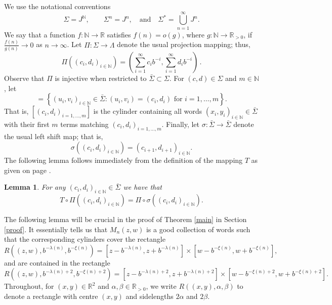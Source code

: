 \documentclass[12pt]{article}
\newtheorem{lemma}[definition]{Lemma}
\theoremstyle{remark}
\numberwithin{equation}{section}
\renewcommand{\Bbb}[1]{\mathbb{#1}}
\newcommand{\N}{{\Bbb N}}         %
\newcommand{\R}{{\Bbb R}}        %
\newcommand{\0}{\mathbf{0}}
\begin{document}
We use the notational conventions
\begin{equation*}
    \Sigma=J^{\N}, \qquad \Sigma^{n}=J^{n}, \quad \text{and} \quad \Sigma^{*}=\bigcup_{n=1}^{\infty}J^{n}.
\end{equation*}
We say that a function $f: \N \to \R$ satisfies $f(n) = o(g)$, where $g: \N \to \R_{>0}$, if $\frac{f(n)}{g(n)} \to 0$ as $n \to \infty$.
Let $\Pi:\Sigma \to \Lambda$ denote the usual projection mapping; thus,
\begin{equation*}
    \Pi((c_{i},d_{i})_{i \in \N}) = \left( \sum_{i=1}^{\infty}c_{i}b^{-i}, \sum_{i=1}^{\infty}d_{i}b^{-i} \right) \, .
\end{equation*}
Observe that $\Pi$ is injective when restricted to $\bar{\Sigma} \subset \Sigma$. For $(c,d) \in \Sigma$ and $m \in \N$, let
\begin{equation*}
    [(c_{i},d_{i})_{i=1, \dots , m}]=\left\{(u_{i},v_{i})_{i \in \N} \in \bar{\Sigma} : (u_{i},v_{i})=(c_{i},d_{i}) \text{ for } i=1, \dots , m \right\}.
\end{equation*}
 That is, $[(c_{i},d_{i})_{i =1, \dots , m}]$ is the cylinder containing all words $(x_{i},y_{i})_{i \in \N} \in \bar{\Sigma}$ with their first $m$ terms matching $(c_{i},d_{i})_{i =1, \dots , m}$. Finally, let $\sigma: \bar{\Sigma} \to \bar{\Sigma}$ denote the usual {left} shift map; that is,
\[\sigma\left( (c_{i},d_{i})_{i \in \N} \right)= (c_{i+1},d_{i+1})_{i \in \N}.\]
The following lemma follows immediately from the definition of the mapping $T$ {as given on page \pageref{T definition}}.

\begin{lemma}
For any $(c_{i},d_{i})_{i \in\N} \in\bar{\Sigma}$ we have that
\begin{equation*}
    T\circ \Pi\left((c_{i},d_{i})_{i \in \N}\right)=\Pi\circ \sigma \left( (c_{i},d_{i})_{i \in \N} \right).
\end{equation*}
\end{lemma}

The following lemma will be crucial
in the proof of Theorem \ref{main} in Section \ref{proof}. It essentially tells us that $M_{n}(z,w)$ is a good collection of words such that the corresponding cylinders cover the rectangle
\begin{equation*}
R\left((z,w), b^{-\lambda(n)}, b^{-\xi(n)}\right)=[z-b^{-\lambda(n)},z+b^{-\lambda(n)}]\times [w-b^{-\xi(n)}, w+b^{-\xi(n)}],
\end{equation*}
and are contained in the rectangle
\begin{equation*}
R\left((z,w), b^{-\lambda(n)+2}, b^{-\xi(n)+2}\right)=[z-b^{-\lambda(n)+2},z+b^{-\lambda(n)+2}]\times [w-b^{-\xi(n)+2}, w+b^{-\xi(n)+2}].
\end{equation*}
Throughout, for $(x,y) \in \R^{2}$ and $\alpha,\beta \in \R_{>0}$, we write $R((x,y),\alpha,\beta)$ to denote a rectangle with centre $(x,y)$ and sidelengths $2\alpha$ and $2\beta$. 
\end{document}
